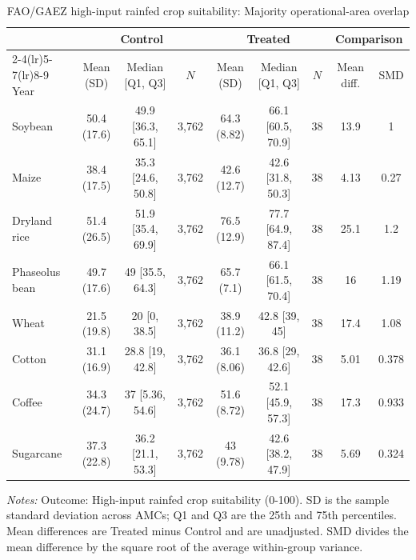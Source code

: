 \begin{table}[!htbp]
\centering
\caption{FAO/GAEZ high-input rainfed crop suitability: Majority operational-area overlap}
\label{tab:polocentro_operational_majority_area_gaez_high_input}
\small
\setlength{\tabcolsep}{4pt}
\begin{tabular}{@{}lcccccccc@{}}
\toprule
& \multicolumn{3}{c}{Control} & \multicolumn{3}{c}{Treated} & \multicolumn{2}{c}{Comparison} \\
\cmidrule(lr){2-4}\cmidrule(lr){5-7}\cmidrule(lr){8-9}
Year & Mean (SD) & Median [Q1, Q3] & $N$ & Mean (SD) & Median [Q1, Q3] & $N$ & Mean diff. & SMD \\
\midrule
Soybean & 50.4 (17.6) & 49.9 [36.3, 65.1] & 3,762 & 64.3 (8.82) & 66.1 [60.5, 70.9] & 38 & 13.9 & 1 \\
Maize & 38.4 (17.5) & 35.3 [24.6, 50.8] & 3,762 & 42.6 (12.7) & 42.6 [31.8, 50.3] & 38 & 4.13 & 0.27 \\
Dryland rice & 51.4 (26.5) & 51.9 [35.4, 69.9] & 3,762 & 76.5 (12.9) & 77.7 [64.9, 87.4] & 38 & 25.1 & 1.2 \\
Phaseolus bean & 49.7 (17.6) & 49 [35.5, 64.3] & 3,762 & 65.7 (7.1) & 66.1 [61.5, 70.4] & 38 & 16 & 1.19 \\
Wheat & 21.5 (19.8) & 20 [0, 38.5] & 3,762 & 38.9 (11.2) & 42.8 [39, 45] & 38 & 17.4 & 1.08 \\
Cotton & 31.1 (16.9) & 28.8 [19, 42.8] & 3,762 & 36.1 (8.06) & 36.8 [29, 42.6] & 38 & 5.01 & 0.378 \\
Coffee & 34.3 (24.7) & 37 [5.36, 54.6] & 3,762 & 51.6 (8.72) & 52.1 [45.9, 57.3] & 38 & 17.3 & 0.933 \\
Sugarcane & 37.3 (22.8) & 36.2 [21.1, 53.3] & 3,762 & 43 (9.78) & 42.6 [38.2, 47.9] & 38 & 5.69 & 0.324 \\
\bottomrule
\end{tabular}
\vspace{2pt}
\begin{minipage}{0.98\linewidth}
\footnotesize \textit{Notes:} Outcome: High-input rainfed crop suitability (0-100). SD is the sample standard deviation across AMCs; Q1 and Q3 are the 25th and 75th percentiles. Mean differences are Treated minus Control and are unadjusted. SMD divides the mean difference by the square root of the average within-group variance.
\end{minipage}
\end{table}